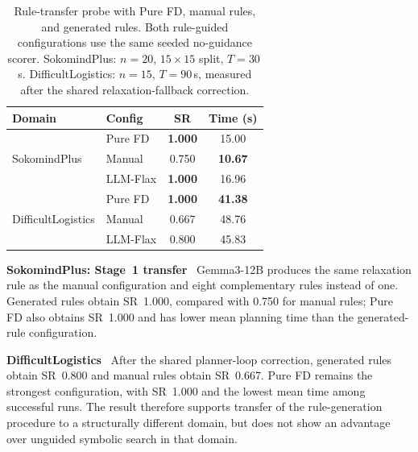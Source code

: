 \documentclass{ieeeaccess}
\newcommand{\myparagraph}[1]{\noindent\textbf{#1}~}
\newcommand{\method}{LLM-Flax\xspace}
\begin{document}
\begin{table}[t]
    \centering
    \caption{Rule-transfer probe with Pure FD, manual rules, and generated rules. Both rule-guided configurations use the same seeded no-guidance scorer. SokomindPlus: $n{=}20$, $15{\times}15$ split, $T{=}30$\,s. DifficultLogistics: $n{=}15$, $T{=}90$\,s, measured after the shared relaxation-fallback correction.}
    \label{tab:crossdomain}
    \small
    \setlength{\tabcolsep}{4pt}
    \renewcommand{\arraystretch}{1.1}
    \begin{tabular}{llcc}
        \toprule
        \textbf{Domain} & \textbf{Config} & \textbf{SR} & \textbf{Time (s)} \\
        \midrule
        \multirow{3}{*}{SokomindPlus}
            & Pure FD  & \textbf{1.000} & 15.00 \\
            & Manual   & 0.750          & \textbf{10.67} \\
            & \method  & \textbf{1.000} & 16.96 \\
        \midrule
        \multirow{3}{*}{DifficultLogistics}
            & Pure FD  & \textbf{1.000} & \textbf{41.38} \\
            & Manual   & 0.667          & 48.76 \\
            & \method  & 0.800          & 45.83 \\
        \bottomrule
    \end{tabular}
\end{table}

\myparagraph{SokomindPlus: Stage~1 transfer}
Gemma3-12B produces the same relaxation rule as the manual configuration and eight complementary rules instead of one.
Generated rules obtain SR~1.000, compared with 0.750 for manual rules; Pure FD also obtains SR~1.000 and has lower mean planning time than the generated-rule configuration.

\myparagraph{DifficultLogistics}
After the shared planner-loop correction, generated rules obtain SR~0.800 and manual rules obtain SR~0.667.
Pure FD remains the strongest configuration, with SR~1.000 and the lowest mean time among successful runs. The result therefore supports transfer of the rule-generation procedure to a structurally different domain, but does not show an advantage over unguided symbolic search in that domain.
\end{document}
